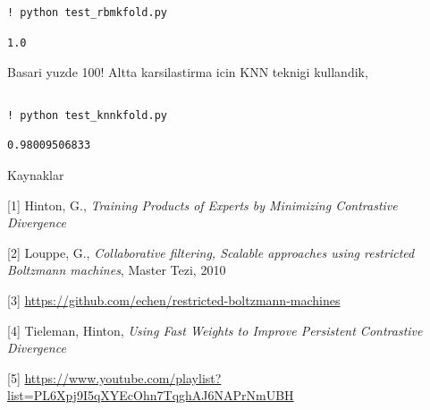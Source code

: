 \documentclass[12pt,fleqn]{article}\usepackage{../common}
\begin{document}
\begin{verbatim}
! python test_rbmkfold.py
\end{verbatim}

\begin{verbatim}
1.0
\end{verbatim}

Basari yuzde 100! Altta karsilastirma icin KNN teknigi kullandik,

\inputminted[fontsize=\footnotesize]{python}{test_knnkfold.py}

\begin{verbatim}
! python test_knnkfold.py
\end{verbatim}

\begin{verbatim}
0.98009506833
\end{verbatim}

Kaynaklar

[1] Hinton, G., {\em Training Products of Experts by Minimizing Contrastive
Divergence}

[2] Louppe, G., {\em Collaborative filtering, Scalable approaches using
restricted Boltzmann machines}, Master Tezi, 2010

[3] \url{https://github.com/echen/restricted-boltzmann-machines}

[4] Tieleman, Hinton, {\em Using Fast Weights to Improve Persistent Contrastive Divergence}

[5] \url{https://www.youtube.com/playlist?list=PL6Xpj9I5qXYEcOhn7TqghAJ6NAPrNmUBH}
\end{document}
